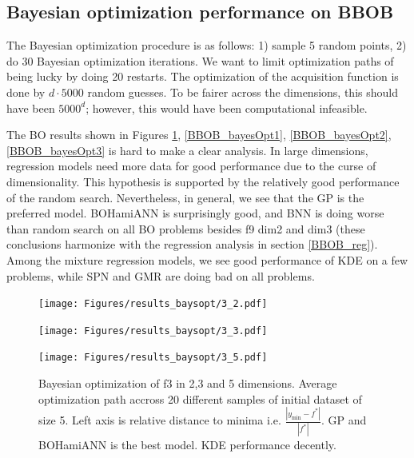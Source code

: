 \subsection{Bayesian optimization performance on BBOB}
The Bayesian optimization procedure is as follows: 1) sample 5 random points, 2) do 30 Bayesian
optimization iterations. We want to limit optimization paths of being lucky by doing 20 restarts.
The optimization of the acquisition function is done by $d \cdot 5000$ random guesses. To be fairer
across the dimensions, this should have been $5000^d$; however, this would have been computational
infeasible. 

The BO results shown in Figures \ref{BBOB_bayesOpt}, \ref{BBOB_bayesOpt1}, \ref{BBOB_bayesOpt2},
\ref{BBOB_bayesOpt3} is hard to make a clear analysis. In large dimensions, regression models need
more data for good performance due to the curse of dimensionality. This hypothesis is supported by
the relatively good performance of the random search. Nevertheless, in general, we see that the GP
is the preferred model. BOHamiANN is surprisingly good, and BNN is doing worse than random search on
all BO problems besides f9 dim2 and dim3 (these conclusions harmonize with the regression analysis
in section \ref{BBOB_reg}). Among the mixture regression models, we see good performance of KDE on a
few problems, while SPN and GMR are doing bad on all problems. 

\begin{figure}[H]
  \centering
  \begin{minipage}[b]{0.32\textwidth}
   \texttt{[image: Figures/results\_baysopt/3\_2.pdf]}
  \end{minipage}
  \hfill
  \begin{minipage}[b]{0.32\textwidth}
    \texttt{[image: Figures/results\_baysopt/3\_3.pdf]}
   \end{minipage}
   \hfill
   \begin{minipage}[b]{0.32\textwidth}
    \texttt{[image: Figures/results\_baysopt/3\_5.pdf]}
   \end{minipage}
  \caption{Bayesian optimization of f3 in 2,3 and 5 dimensions. Average optimization path accross 20 different samples of initial dataset of size 5. 
  Left axis is relative distance to minima i.e. $\frac{|y_{\min}-f^*|}{|f^*|}$. GP and BOHamiANN is the best model. KDE performance decently.}
  \label{BBOB_bayesOpt}
\end{figure}

